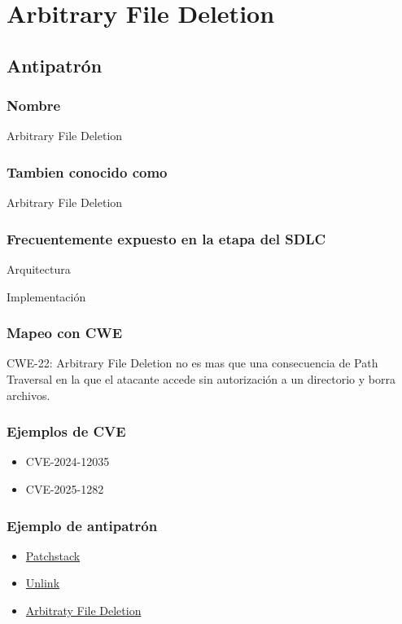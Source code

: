 \chapter{Arbitrary File Deletion}
\section{Antipatrón}
\subsection{Nombre}
Arbitrary File Deletion
\subsection{Tambien conocido como}
Arbitrary File Deletion

\subsection{Frecuentemente expuesto en la etapa del SDLC}
Arquitectura

Implementación
\subsection{Mapeo con CWE}
CWE-22: Arbitrary File Deletion no es mas que una consecuencia de Path Traversal en la que el atacante accede sin autorización a un directorio y borra archivos.
\subsection{Ejemplos de CVE}
\begin{itemize}
    \item CVE-2024-12035
    \item CVE-2025-1282
\end{itemize}
\subsection{Ejemplo de antipatrón}
\begin{itemize}
    \item \href{https://patchstack.com/articles/common-plugin-vulnerabilities-how-to-fix-them/}{Patchstack}
    \item \href{https://www.php.net/unlink}{Unlink}
    \item \href{https://patchstack.com/academy/wordpress/vulnerabilities/arbitrary-file-deletion/}{Arbitraty File Deletion}
\end{itemize}

